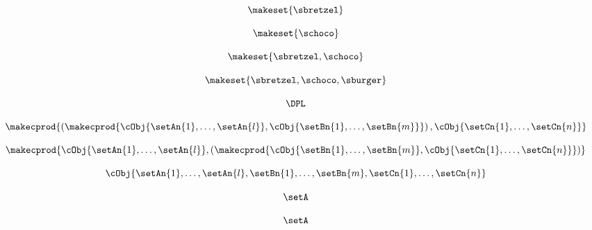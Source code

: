 \begin{forslides}
    \begin{equation}
        \label{eq:parallelism-156}
        \makeset{ \sbretzel }
    \end{equation}

    \begin{equation}
        \label{eq:parallelism-157}
        \makeset{ \schoco }
    \end{equation}

    \begin{equation}
        \label{eq:parallelism-158}
        \makeset{ \sbretzel, \schoco }
    \end{equation}

    \begin{equation}
        \label{eq:parallelism-159}
        \makeset{ \sbretzel, \schoco, \sburger }
    \end{equation}

    \begin{equation}
        \label{eq:parallelism-160}
        \DPL
    \end{equation}

    \begin{equation}
    \label{eq:parallelism-161}
    \makecprod{
        \left ( \makecprod{\cObj{\setAn{1}, \ldots, \setAn{l}}, \cObj{\setBn{1}, \ldots, \setBn{m}}} \right )
        ,
        \cObj{\setCn{1}, \ldots, \setCn{n}}
    }
\end{equation}

    \begin{equation}
        \label{eq:parallelism-162}
            \makecprod{
        \cObj{\setAn{1}, \ldots, \setAn{l}},
        \left (
        \makecprod{
            \cObj{\setBn{1}, \ldots, \setBn{m}},
            \cObj{\setCn{1}, \ldots, \setCn{n}}
        }
        \right )
    }
    \end{equation}

    \begin{equation}
        \label{eq:parallelism-163}
            \cObj{\setAn{1}, \ldots, \setAn{l}, \setBn{1}, \ldots, \setBn{m}, \setCn{1}, \ldots, \setCn{n}}
    \end{equation}

    \begin{equation}
        \label{eq:parallelism-164}
        \setA
    \end{equation}

    \begin{equation}
        \label{eq:parallelism-165}
        \setA
    \end{equation}


\end{forslides}
